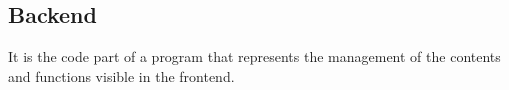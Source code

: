 \section{}



\subsection*{Backend}
It is the code part of a program that represents the management of the contents and functions visible in the frontend. 